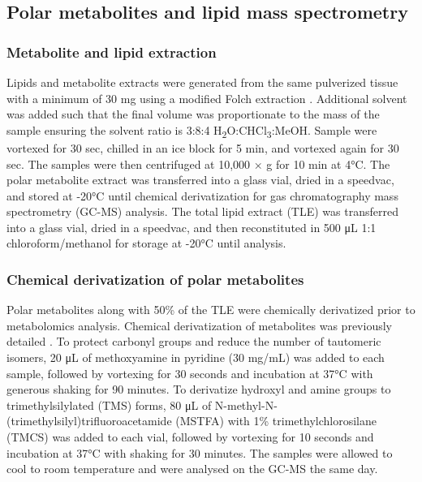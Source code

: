 \subsection{Polar metabolites and lipid mass spectrometry}

\subsubsection{Metabolite and lipid extraction}
Lipids and metabolite extracts were generated from the same pulverized tissue with a minimum of 30 mg using a modified Folch extraction \cite{nakayasues_metzto:MPLExRobust2016}. Additional solvent was added such that the final volume was proportionate to the mass of the sample ensuring the solvent ratio is 3:8:4 H\textsubscript{2}O:CHCl\textsubscript{3}:MeOH. Sample were vortexed for 30 sec, chilled in an ice block for 5 min, and vortexed again for 30 sec. The samples were then centrifuged at 10,000 × g for 10 min at 4°C. The polar metabolite extract was transferred into a glass vial, dried in a speedvac, and stored at -20°C until chemical derivatization for gas chromatography mass spectrometry (GC-MS) analysis. The total lipid extract (TLE) was transferred into a glass vial, dried in a speedvac, and then reconstituted in 500 μL 1:1 chloroform/methanol for storage at -20°C until analysis.

\subsubsection{Chemical derivatization of polar metabolites}
Polar metabolites along with 50\% of the TLE were chemically derivatized prior to metabolomics analysis. Chemical derivatization of metabolites was previously detailed \cite{webb-robertsonbj_metzto:StatisticalAnalysis2014}. To protect carbonyl groups and reduce the number of tautomeric isomers, 20 μL of methoxyamine in pyridine (30 mg/mL) was added to each sample, followed by vortexing for 30 seconds and incubation at 37°C with generous shaking for 90 minutes. To derivatize hydroxyl and amine groups to trimethylsilylated (TMS) forms, 80 μL of N-methyl-N-(trimethylsilyl)trifluoroacetamide (MSTFA) with 1\% trimethylchlorosilane (TMCS) was added to each vial, followed by vortexing for 10 seconds and incubation at 37°C with shaking for 30 minutes. The samples were allowed to cool to room temperature and were analysed on the GC-MS the same day.

